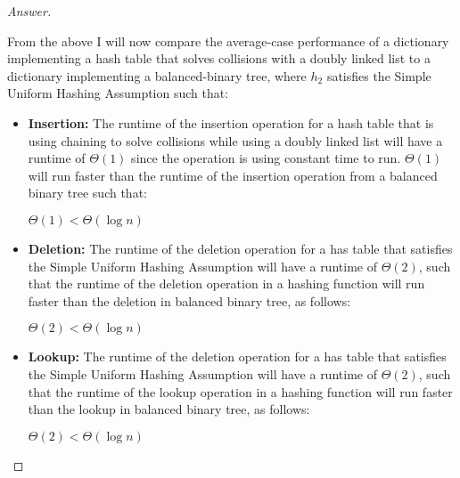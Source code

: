 \documentclass[11pt]{article}
\theoremstyle{definition}
\theoremstyle{definition}
\theoremstyle{definition}
\begin{document}
\begin{enumerate}[label=(\alph*)]
\begin{proof}[Answer]
\begin{center}
\end{center}
From the above I will now compare the average-case performance of a dictionary implementing a hash table that solves collisions with a doubly linked list to a dictionary implementing a balanced-binary tree, where $h_2$ satisfies the Simple Uniform Hashing Assumption such that: \\
\begin{itemize}
\item \textbf{Insertion:} The runtime of the insertion operation for a hash table that is using chaining to solve collisions while using a doubly linked list will have a runtime of $\Theta(1)$ since the operation is using constant time to run. $\Theta(1)$ will run faster than the runtime of the insertion operation from a balanced binary tree such that: \\
\begin{center}
$\Theta(1) < \Theta(\log n)$
\end{center}
\item \textbf{Deletion:} The runtime of the deletion operation for a has table that satisfies the Simple Uniform Hashing Assumption will have a runtime of $\Theta(2)$, such that the runtime of the deletion operation in a hashing function will run faster than the deletion in balanced binary tree, as follows: \\
\begin{center}
$\Theta(2) < \Theta(\log n)$
\end{center}
\item \textbf{Lookup:} The runtime of the deletion operation for a has table that satisfies the Simple Uniform Hashing Assumption will have a runtime of $\Theta(2)$, such that the runtime of the lookup operation in a hashing function will run faster than the lookup in balanced binary tree, as follows: \\
\begin{center}
$\Theta(2) <\Theta(\log n)$
\end{center}
\end{itemize}
\end{proof}
    

\end{enumerate}
\end{document}
